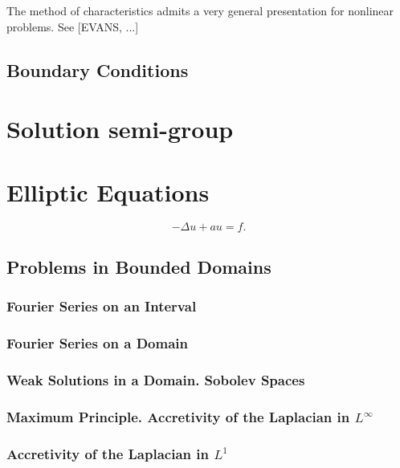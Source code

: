 The method of characteristics admits a very general presentation for nonlinear problems. See [EVANS, ...] 

\subsection{Boundary Conditions}

\section{Solution semi-group}


\section{Elliptic Equations}

\begin{equation}
    \label{eq:Laplace}
    -\Delta u + a u = f.
\end{equation}

\subsection{Problems in Bounded Domains}

\subsubsection{Fourier Series on an Interval}

\subsubsection{Fourier Series on a Domain}

\subsubsection{Weak Solutions in a Domain. Sobolev Spaces}

\subsubsection{Maximum Principle. Accretivity of the Laplacian in $L^\infty$}

\subsubsection{Accretivity of the Laplacian in $L^1$}



